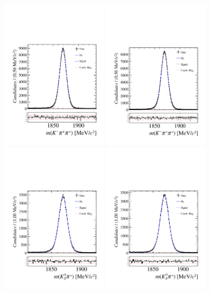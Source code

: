 \begin{figure}[h]
\includegraphics[height=!,width=0.4\textwidth]{figs/KpiAsym/fit_negative_kpipi_11up.pdf}
\includegraphics[height=!,width=0.4\textwidth]{figs/KpiAsym/fit_positive_kpipi_11up.pdf}\\
\includegraphics[height=!,width=0.4\textwidth]{figs/KpiAsym/fit_negative_kspi_11up.pdf}
\includegraphics[height=!,width=0.4\textwidth]{figs/KpiAsym/fit_positive_kspi_11up.pdf}

\end{figure}

